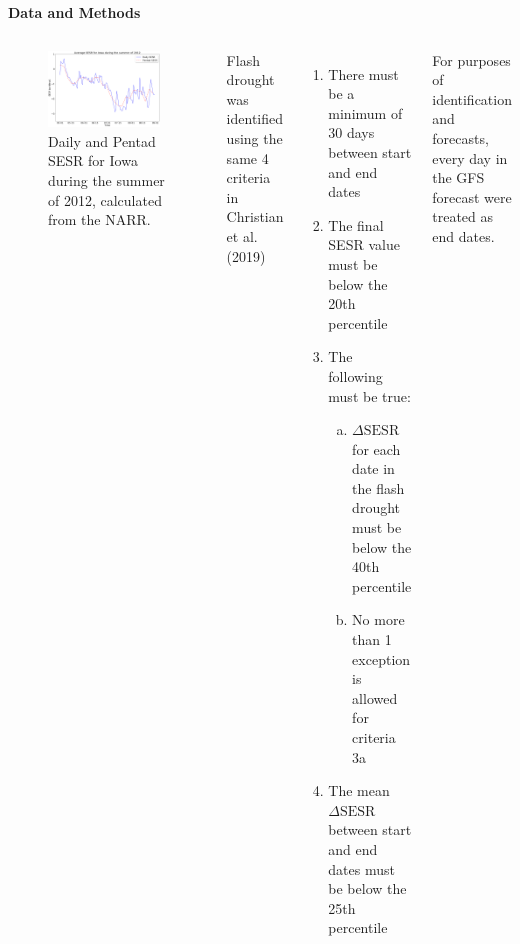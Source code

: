 \documentclass{beamer}
\begin{document}
\begin{frame}[t]{}
\begin{columns}[t]
\begin{creambox}
\begin{block}{\bfseries Data and Methods}
\begin{columns}[t]
						\begin{figure}
							\captionsetup{width = 0.95\textwidth}
							\includegraphics[width = 0.95\textwidth, frame]{../Figures/Poster/Daily_SESR_vs_Pentad_SESR.png}
							\caption{Daily and Pentad SESR for Iowa during the summer of 2012, calculated from the NARR.}
						\end{figure}
						
						Flash drought was identified using the same 4 criteria in Christian et al. (2019)%
						\begin{enumerate}
							\item There must be a minimum of 30 days between start and end dates
							\item The final SESR value must be below the 20th percentile
							\item The following must be true:
							\begin{enumerate}[a)]
								\item $\Delta \text{SESR}$ for each date in the flash drought must be below the 40th percentile
								\item No more than 1 exception is allowed for criteria 3a
							\end{enumerate}
							\item The mean $\Delta \text{SESR}$ between start and end dates must be below the 25th percentile
						\end{enumerate}
						For purposes of identification and forecasts, every day in the GFS forecast were treated as end dates.
						

\end{columns}
\end{block}
\end{creambox}
\end{columns}
\end{frame}
\end{document}
